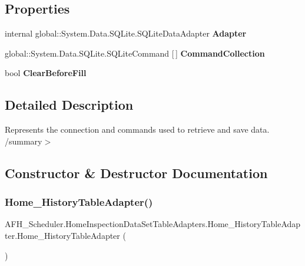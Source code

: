 \subsection*{Properties}
\begin{DoxyCompactItemize}
\item 
internal global\+::\+System.\+Data.\+S\+Q\+Lite.\+S\+Q\+Lite\+Data\+Adapter \textbf{ Adapter}\hspace{0.3cm}{\ttfamily  [get]}
\item 
global\+::\+System.\+Data.\+S\+Q\+Lite.\+S\+Q\+Lite\+Command [$\,$] \textbf{ Command\+Collection}\hspace{0.3cm}{\ttfamily  [get]}
\item 
bool \textbf{ Clear\+Before\+Fill}\hspace{0.3cm}{\ttfamily  [get, set]}
\end{DoxyCompactItemize}


\subsection{Detailed Description}
Represents the connection and commands used to retrieve and save data. /summary$>$ 

\subsection{Constructor \& Destructor Documentation}
\mbox{\label{class_a_f_h___scheduler_1_1_home_inspection_data_set_table_adapters_1_1_home___history_table_adapter_aa26e52bc16fa9c6f70a1714b0feb2d90}} 
\subsubsection{Home\_HistoryTableAdapter()}
{\footnotesize\ttfamily A\+F\+H\+\_\+\+Scheduler.\+Home\+Inspection\+Data\+Set\+Table\+Adapters.\+Home\+\_\+\+History\+Table\+Adapter.\+Home\+\_\+\+History\+Table\+Adapter (\begin{DoxyParamCaption}{ }\end{DoxyParamCaption})}



